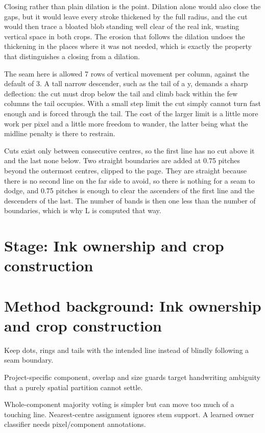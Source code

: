 Closing rather than plain dilation is the point. Dilation alone would also close the gaps, but it would leave every stroke thickened by the full radius, and the cut would then trace a bloated blob standing well clear of the real ink, wasting vertical space in both crops. The erosion that follows the dilation undoes the thickening in the places where it was not needed, which is exactly the property that distinguishes a closing from a dilation.


The seam here is allowed 7 rows of vertical movement per column, against the default of 3. A tall narrow descender, such as the tail of a y, demands a sharp deflection: the cut must drop below the tail and climb back within the few columns the tail occupies. With a small step limit the cut simply cannot turn fast enough and is forced through the tail. The cost of the larger limit is a little more work per pixel and a little more freedom to wander, the latter being what the midline penalty is there to restrain.


Cuts exist only between consecutive centres, so the first line has no cut above it and the last none below. Two straight boundaries are added at 0.75 pitches beyond the outermost centres, clipped to the page. They are straight because there is no second line on the far side to avoid, so there is nothing for a seam to dodge, and 0.75 pitches is enough to clear the ascenders of the first line and the descenders of the last. The number of bands is then one less than the number of boundaries, which is why L is computed that way.



\section*{Stage: Ink ownership and crop construction}
\section{Method background: Ink ownership and crop construction}\label{method:ownership}
Keep dots, rings and tails with the intended line instead of blindly following a seam boundary.


Project-specific component, overlap and size guards target handwriting ambiguity that a purely spatial partition cannot settle.


Whole-component majority voting is simpler but can move too much of a touching line. Nearest-centre assignment ignores stem support. A learned owner classifier needs pixel/component annotations.


